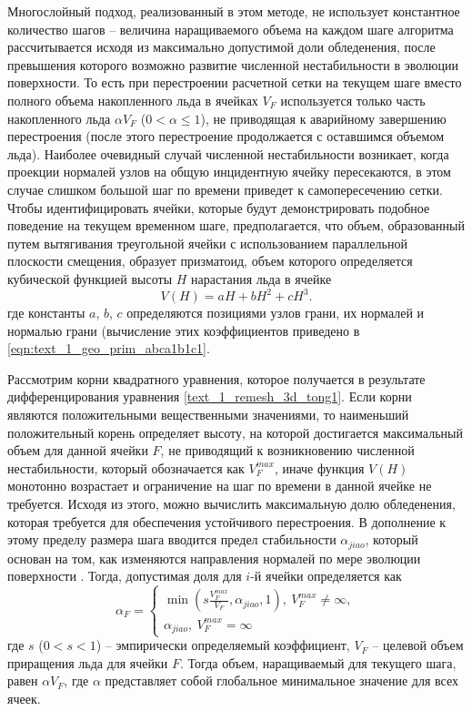Многослойный подход, реализованный в этом методе, не использует константное количество шагов -- величина наращиваемого объема на каждом шаге алгоритма рассчитывается исходя из максимально допустимой доли обледенения, после превышения которого возможно развитие численной нестабильности в эволюции поверхности.
То есть при перестроении расчетной сетки на текущем шаге вместо полного объема накопленного льда в ячейках $V_F$ используется только часть накопленного льда $\alpha V_F$ ($0 < \alpha \le 1$), не приводящая к аварийному завершению перестроения (после этого перестроение продолжается с оставшимся объемом льда).
Наиболее очевидный случай численной нестабильности возникает, когда проекции нормалей узлов на общую инцидентную ячейку пересекаются, в этом случае слишком большой шаг по времени приведет к самопересечению сетки.
Чтобы идентифицировать ячейки, которые будут демонстрировать подобное поведение на текущем временном шаге, предполагается, что объем, образованный путем вытягивания треугольной ячейки с использованием параллельной плоскости смещения, образует призматоид, объем которого определяется кубической функцией высоты $H$ нарастания льда в ячейке
\begin{equation}\label{text_1_remesh_3d_tong1}
	V(H)=aH+bH^2+cH^3.
\end{equation}
где константы $a$, $b$, $c$ определяются позициями узлов грани, их нормалей и нормалью грани (вычисление этих коэффициентов приведено в \eqref{eqn:text_1_geo_prim_abca1b1c1}.

Рассмотрим корни квадратного уравнения, которое получается в результате дифференцирования уравнения \eqref{text_1_remesh_3d_tong1}.
Если корни являются положительными вещественными значениями, то наименьший положительный корень определяет высоту, на которой достигается максимальный объем для данной ячейки $F$, не приводящий к возникновению численной нестабильности, который обозначается как $V_F^{max}$, иначе функция $V(H)$ монотонно возрастает и ограничение на шаг по времени в данной ячейке не требуется.
Исходя из этого, можно вычислить максимальную долю обледенения, которая требуется для обеспечения устойчивого перестроения.
В дополнение к этому пределу размера шага вводится предел стабильности $\alpha_{jiao}$, который основан на том, как изменяются направления нормалей по мере эволюции поверхности \cite{Jiao2007Offsetting}.
Тогда, допустимая доля для $i$-й ячейки определяется как
\begin{equation}
\alpha_F =
	\begin{cases}
		\min \left( s \frac{V_F^{max}}{V_F}, \alpha_{jiao}, 1 \right), \ V_F^{max} \ne \infty, \\
		\alpha_{jiao}, \ V_F^{max} = \infty
	\end{cases}
\end{equation}
где $s$ ($0 < s < 1$) -- эмпирически определяемый коэффициент, $V_F$ -- целевой объем приращения льда для ячейки $F$.
Тогда объем, наращиваемый для текущего шага, равен $\alpha V_F$, где $\alpha$ представляет собой глобальное минимальное значение для всех ячеек.

